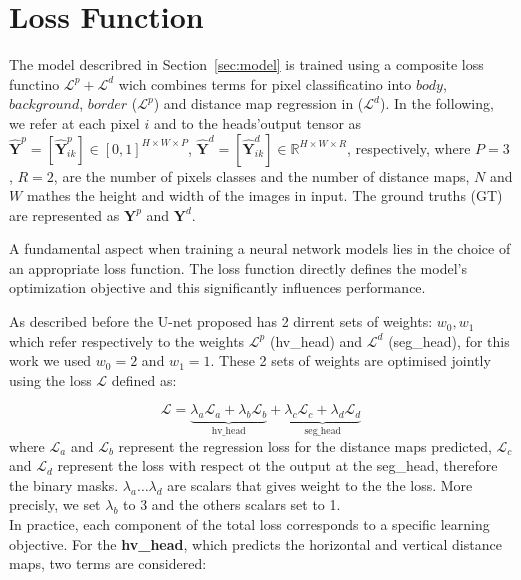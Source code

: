 \documentclass[target=bach,aauheader=,style=]{thud}
\begin{document}
\section{Loss Function}
\label{sec:loss}
The model describred in Section~\ref{sec:model} is trained using a composite loss functino $\mathcal{L}^p+\mathcal{L}^d$ wich combines terms for pixel classificatino into $body$, $background$, $border$ ($\mathcal{L}^p$) and distance map regression in ($\mathcal{L}^d$).
In the following, we refer at each pixel $i$ and to the heads'output tensor as $\widehat{\mathbf{Y}}^p=[\widehat{\mathbf{Y}}^p_{ik}]\in [0,1]^{H\times W\times P}$, $\widehat{\mathbf{Y}}^d=[\widehat{\mathbf{Y}}^d_{ik}]\in \mathbb{R}^{H\times W\times R}$, respectively, where $P = 3$, $R = 2$, are the number of pixels classes and the number of distance maps, $N$ and $W$ mathes the height and width of the images in input. The ground truths (GT) are represented as $\mathbf{Y}^p$ and $\mathbf{Y}^d$.

A fundamental aspect when training a neural network models lies in the choice of an appropriate loss function. The loss function directly defines the model's optimization objective and this significantly influences performance.

As described before the U-net proposed has 2 dirrent sets of weights: $w_0, w_1$ which refer respectively to the weights $\mathcal{L}^p$ (hv\_head) and $\mathcal{L}^d$ (seg\_head), for this work we used $w_0=2$ and $w_1=1$. These 2 sets of weights are optimised jointly using the loss $\mathcal{L}$ defined as:

\begin{equation}
\mathcal{L} =
\underbrace{\lambda_a \mathcal{L}_a + \lambda_b \mathcal{L}_b}_{\text{hv\_head}} +
\underbrace{\lambda_c \mathcal{L}_c + \lambda_d \mathcal{L}_d}_{\text{seg\_head}}
\end{equation}
where $\mathcal{L}_a$ and $\mathcal{L}_b$ represent the regression loss for the distance maps predicted, $\mathcal{L}_c$ and $\mathcal{L}_d$ represent the loss with respect ot the output at the seg\_head, therefore the binary masks. $\lambda_a\dots\lambda_d$ are scalars that gives weight to the the loss. More precisly, we set $\lambda_b$ to 3 and the others scalars set to 1. \\

In practice, each component of the total loss corresponds to a specific learning objective. 
For the \textbf{hv\_head}, which predicts the horizontal and vertical distance maps, two terms are considered: 
\end{document}
